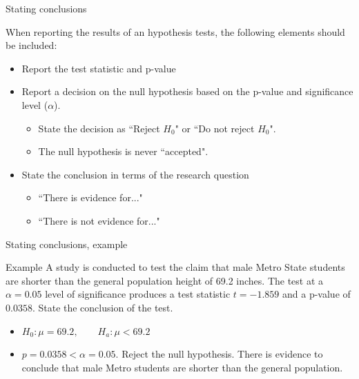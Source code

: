 \documentclass[xcolor=table, aspectratio=169, bigger]{beamer}
\begin{document}
\begin{frame}{Stating conclusions}
\begin{block}{}
When reporting the results of an hypothesis tests, the following elements should be included:
\begin{itemize}
\pause\item Report the test statistic and p-value
\pause\item Report a decision on the null hypothesis based on the p-value and significance level ($\alpha$). 
\begin{itemize}
\item State the decision as ``Reject $H_0$" or ``Do not reject $H_0$".
\item The null hypothesis is never ``accepted".
\end{itemize}
\pause\item State the conclusion in terms of the research question
\begin{itemize}
\item ``There is evidence for..."
\item ``There is not evidence for..."
\end{itemize}
\end{itemize}
\end{block}
\end{frame}

\begin{frame}{Stating conclusions, example}
\begin{exampleblock}{Example}
A study is conducted to test the claim that male Metro State students are shorter than the general population height of 69.2 inches. The test at a $\alpha=0.05$ level of significance produces a test statistic $t=-1.859$ and a p-value of $0.0358$. State the conclusion of the test.
\begin{itemize}
\pause\item $H_0: \mu=69.2, \qquad H_a: \mu < 69.2$
\pause\item $p=0.0358 < \alpha = 0.05$. Reject the null hypothesis. There is evidence to conclude that male Metro students are shorter than the general population.
\end{itemize}
\end{exampleblock}
\end{frame}
\end{document}
